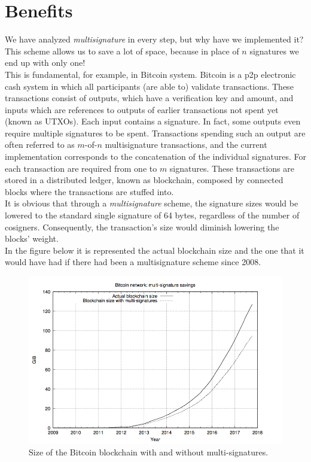 \section{Benefits}
We have analyzed \textit{multisignature} in every step, but why have we implemented it?\\
This scheme allows us to save a lot of space, because in place of $n$ signatures we end up with only one!\\
This is fundamental, for example, in Bitcoin system. Bitcoin \cite{Nakamoto} is a p2p electronic cash system in which all participants (are able to) validate transactions. These transactions consist of outputs, which have a verification key and amount, and inputs which are references to outputs of earlier transactions not spent yet (known as UTXOs). Each input contains a signature. In fact, some outputs even require multiple signatures to be spent. Transactions spending such an output are often referred to as $m$-of-$n$ multisignature transactions, and the current implementation corresponds to the concatenation of the individual signatures. For each transaction are required from one to $m$ signatures. These transactions are stored in a distributed ledger, known as blockchain, composed by connected blocks where the transactions are stuffed into.\\
It is obvious that through a \textit{multisignature} scheme, the signature sizes would be lowered to the standard single signature of 64 bytes, regardless of the number of cosigners. Consequently, the transaction's size would diminish lowering the blocks' weight.\\
In the figure below it is represented the actual blockchain size and the one that it would have had if there had been a multisignature scheme since 2008.
\begin{figure}[H]
	\centering
	\includegraphics[width=.85\textwidth]{BlockchainMusig.png}
	\caption{Size of the Bitcoin blockchain with and without multi-signatures.}
	\label{img:BlockchainMusig}
\end{figure}